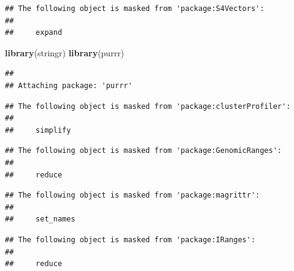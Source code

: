\documentclass[
]{article}
\newenvironment{Shaded}{\begin{snugshade}}{\end{snugshade}}
\newcommand{\FunctionTok}[1]{\textcolor[rgb]{0.13,0.29,0.53}{\textbf{#1}}}
\newcommand{\NormalTok}[1]{#1}
\begin{document}
\begin{verbatim}
## The following object is masked from 'package:S4Vectors':
## 
##     expand
\end{verbatim}

\begin{Shaded}
\begin{Highlighting}[]
\FunctionTok{library}\NormalTok{(stringr)}
\FunctionTok{library}\NormalTok{(purrr)}
\end{Highlighting}
\end{Shaded}

\begin{verbatim}
## 
## Attaching package: 'purrr'
\end{verbatim}

\begin{verbatim}
## The following object is masked from 'package:clusterProfiler':
## 
##     simplify
\end{verbatim}

\begin{verbatim}
## The following object is masked from 'package:GenomicRanges':
## 
##     reduce
\end{verbatim}

\begin{verbatim}
## The following object is masked from 'package:magrittr':
## 
##     set_names
\end{verbatim}

\begin{verbatim}
## The following object is masked from 'package:IRanges':
## 
##     reduce
\end{verbatim}
\end{document}
